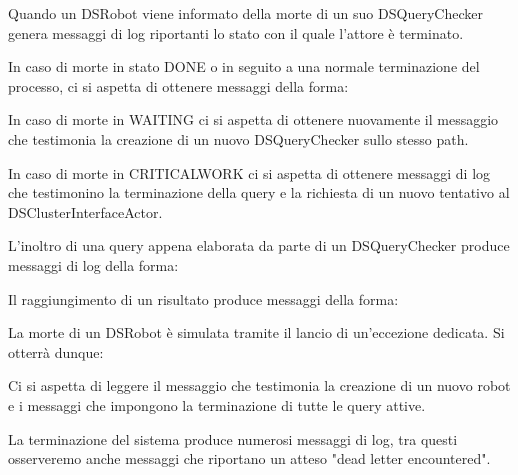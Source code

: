 Quando un DSRobot viene informato della morte di un suo DSQueryChecker
genera messaggi di log riportanti lo stato con il quale l'attore è terminato.

In caso di morte in stato DONE o in seguito a una normale terminazione del
processo, ci si aspetta di ottenere messaggi della forma:

In caso di morte in WAITING ci si aspetta di ottenere nuovamente il messaggio
che testimonia la creazione di un nuovo DSQueryChecker sullo stesso path.

In caso di morte in CRITICALWORK ci si aspetta di ottenere messaggi di log
che testimonino la terminazione della query e la richiesta di un nuovo
tentativo al DSClusterInterfaceActor.

L'inoltro di una query appena elaborata da parte di un DSQueryChecker produce
messaggi di log della forma:

Il raggiungimento di un risultato produce messaggi della forma:

La morte di un DSRobot è simulata tramite il lancio di un'eccezione dedicata. Si otterrà dunque:

Ci si aspetta di leggere il messaggio che testimonia la creazione di un nuovo robot
e i messaggi che impongono la terminazione di tutte le query attive.

La terminazione del sistema produce numerosi messaggi di log, tra questi
osserveremo anche messaggi che riportano un atteso "dead letter encountered".
